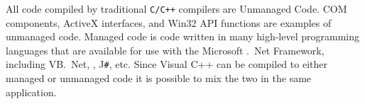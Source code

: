 All code compiled by traditional \texttt{C/C++} compilers are Unmanaged Code. COM components, ActiveX interfaces, and Win32 API functions are examples of unmanaged code. Managed code is code written in many high-level programming languages that are available for use with the Microsoft .\ Net Framework, including VB.\ Net, {\cs}, J{\texttt{\#}},  etc. Since Visual C++ can be compiled to either managed or unmanaged code it is possible to mix the two in the same application.


%
%
%
%
%
%
